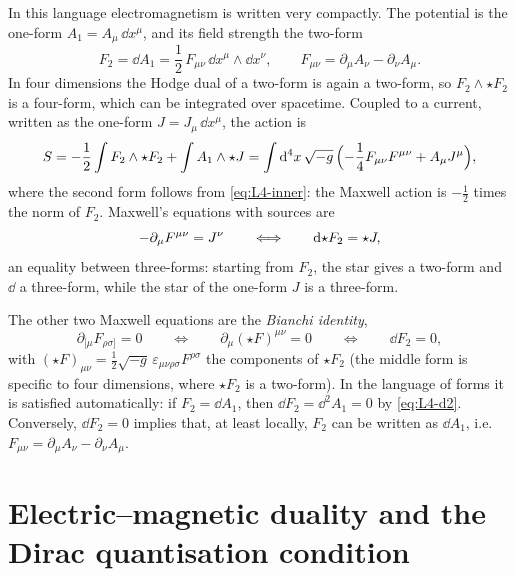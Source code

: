 In this language electromagnetism is written very compactly. The potential is the one-form $A_1 = A_\mu\,\dd x^\mu$, and its field strength the two-form
\begin{equation*}
  F_2 = \dd A_1 = \frac12\,F_{\mu\nu}\,\dd x^\mu\wedge\dd x^\nu ,\qquad F_{\mu\nu} = \partial_\mu A_\nu - \partial_\nu A_\mu .
\end{equation*}
In four dimensions the Hodge dual of a two-form is again a two-form, so $F_2\wedge\star F_2$ is a four-form, which can be integrated over spacetime. Coupled to a current, written as the one-form $J = J_\mu\,\dd x^\mu$, the action is
\begin{equation}
  S = -\frac12\int F_2\wedge\star F_2 + \int A_1\wedge\star J
  = \int\mathrm{d}^4x\,\sqrt{-g}\,\Bigl(-\frac14F_{\mu\nu}F^{\mu\nu} + A_\mu J^\mu\Bigr) ,
  \label{eq:L4-maxwell}
\end{equation}
where the second form follows from \cref{eq:L4-inner}: the Maxwell action is $-\frac12$ times the norm of $F_2$. Maxwell's equations with sources are
\begin{equation}
  -\partial_\mu F^{\mu\nu} = J^\nu
  \qquad\Longleftrightarrow\qquad
  \mathrm{d}{\mathord{\star} F_2} = \star J ,
  \label{eq:L4-maxwell-eq}
\end{equation}
an equality between three-forms: starting from $F_2$, the star gives a two-form and $\dd$ a three-form, while the star of the one-form $J$ is a three-form.

The other two Maxwell equations are the \emph{Bianchi identity},
\begin{equation}
  \partial_{[\mu}F_{\rho\sigma]} = 0
  \qquad\Longleftrightarrow\qquad
  \partial_\mu(\star F)^{\mu\nu} = 0
  \qquad\Longleftrightarrow\qquad
  \dd F_2 = 0 ,
  \label{eq:L4-bianchi}
\end{equation}
with $(\star F)_{\mu\nu} = \frac12\sqrt{-g}\,\varepsilon_{\mu\nu\rho\sigma}F^{\rho\sigma}$ the components of $\star F_2$ (the middle form is specific to four dimensions, where $\star F_2$ is a two-form). In the language of forms it is satisfied automatically: if $F_2 = \dd A_1$, then $\dd F_2 = \dd^2A_1 = 0$ by \cref{eq:L4-d2}. Conversely, $\dd F_2 = 0$ implies that, at least locally, $F_2$ can be written as $\dd A_1$, i.e.\ $F_{\mu\nu} = \partial_\mu A_\nu - \partial_\nu A_\mu$.

\section{Electric--magnetic duality and the Dirac quantisation condition}
\label{sec:L4-duality}

